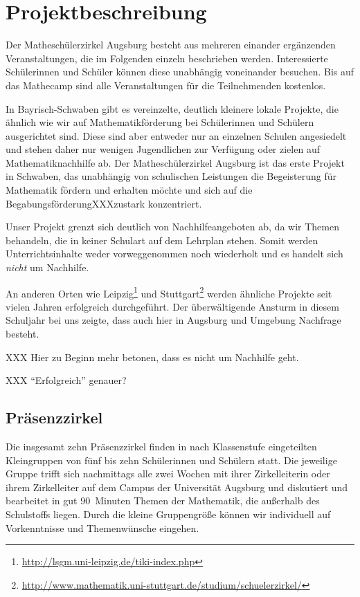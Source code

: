 \documentclass[12pt]{zettel}
\begin{document}
\section{Projektbeschreibung}

Der Matheschülerzirkel Augsburg besteht aus mehreren einander ergänzenden Veranstaltungen, die im
Folgenden einzeln beschrieben werden. Interessierte Schülerinnen und Schüler
können diese unabhängig voneinander besuchen. Bis auf das Mathecamp sind alle
Veranstaltungen für die Teilnehmenden kostenlos.

In Bayrisch-Schwaben gibt es vereinzelte, deutlich kleinere lokale
Projekte, die ähnlich wie wir auf Mathematikförderung bei Schülerinnen und
Schülern ausgerichtet sind. Diese sind aber entweder nur an einzelnen Schulen
angesiedelt und stehen daher nur wenigen Jugendlichen zur Verfügung oder zielen
auf Mathematiknachhilfe ab. Der Matheschülerzirkel Augsburg ist das erste
Projekt in Schwaben, das unabhängig von schulischen Leistungen die
Begeisterung für Mathematik fördern und erhalten möchte und sich auf die
BegabungsförderungXXXzustark konzentriert.

Unser Projekt grenzt sich deutlich von Nachhilfeangeboten ab, da wir Themen behandeln, die in keiner Schulart auf dem Lehrplan stehen. Somit werden Unterrichtsinhalte weder vorweggenommen noch wiederholt und es handelt sich \emph{nicht} um Nachhilfe.

An anderen Orten wie Leipzig\footnote{\url{http://lsgm.uni-leipzig.de/tiki-index.php}} und Stuttgart\footnote{\url{http://www.mathematik.uni-stuttgart.de/studium/schuelerzirkel/}} werden ähnliche Projekte seit
vielen Jahren erfolgreich durchgeführt. Der überwältigende Ansturm in
diesem Schuljahr bei uns zeigte, dass auch hier in Augsburg und Umgebung Nachfrage
besteht.

XXX Hier zu Beginn mehr betonen, dass es nicht um Nachhilfe geht.

XXX ``Erfolgreich'' genauer?

\subsection{Präsenzzirkel}

Die insgesamt zehn Präsenzzirkel finden in nach Klassenstufe eingeteilten
Kleingruppen von fünf bis zehn Schülerinnen und Schülern statt.
Die jeweilige Gruppe trifft sich nachmittags alle zwei Wochen mit ihrer Zirkelleiterin oder ihrem
Zirkelleiter auf dem Campus der Universität Augsburg und diskutiert und
bearbeitet in gut 90~Minuten Themen der Mathematik, die außerhalb des
Schulstoffs liegen. Durch die kleine Gruppengröße können wir individuell auf
Vorkenntnisse und Themenwünsche eingehen.
\end{document}
